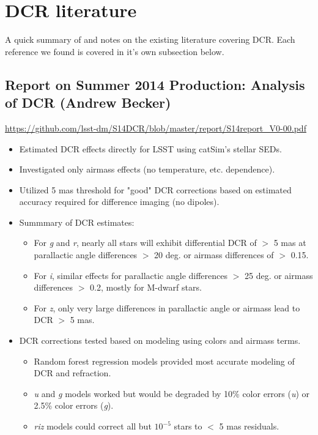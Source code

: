 \documentclass[DM,authoryear,toc]{lsstdoc}
\begin{document}
\section{DCR literature}
A quick summary of and notes on the existing literature covering DCR. Each reference we found is covered in it's own subsection below.

\subsection{Report on Summer 2014 Production: Analysis of DCR (Andrew Becker)}

\url{https://github.com/lsst-dm/S14DCR/blob/master/report/S14report_V0-00.pdf}

\begin{itemize}
	\item Estimated DCR effects directly for LSST using catSim's stellar
	SEDs.
	\item Investigated only airmass effects (no temperature,
          etc. dependence).
	\item Utilized 5 mas threshold for "good" DCR corrections
          based on estimated accuracy required for difference imaging
          (no dipoles).
	\item Summmary of DCR estimates:
	
	\begin{itemize}
		
		\item For \textit{g} and \textit{r}, nearly all stars
                  will exhibit differential DCR of $>$ 5 mas at
                  parallactic angle differences $>$ 20 deg. or airmass
                  differences of $>$ 0.15.
		\item For \textit{i}, similar effects for parallactic
                  angle differences $>$ 25 deg. or airmass differences
                  $>$ 0.2, mostly for M-dwarf stars.
		\item For \textit{z}, only very large differences in
                  parallactic angle or airmass lead to DCR $>$ 5 mas.
	\end{itemize}
	\item DCR corrections tested based on modeling using colors and airmass terms.
	\begin{itemize}
		\item Random forest regression models provided most
                  accurate modeling of DCR and refraction.
		\item \textit{u} and \textit{g} models worked but
                  would be degraded by 10\% color errors (\textit{u})
                  or 2.5\% color errors (\textit{g}).
		\item \textit{riz} models could correct all but
                  $10^{-5}$ stars to $<$ 5 mas residuals.
	\end{itemize}
\end{itemize}
\end{document}
